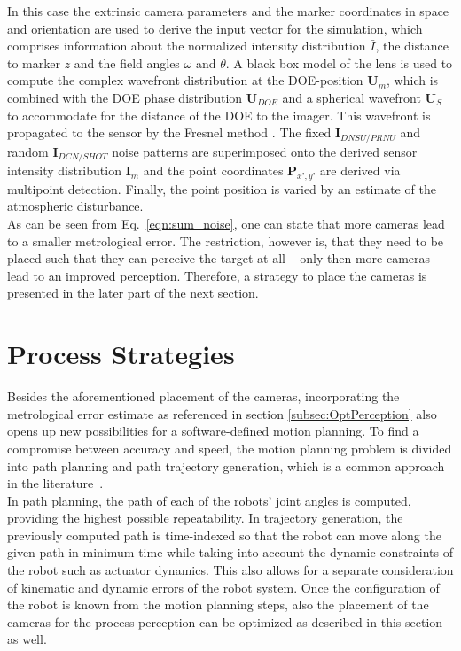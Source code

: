 \documentclass[5p,times,procedia]{elsarticle}
\begin{document}
%
In this case the extrinsic camera parameters and the marker coordinates in space and orientation are used to derive
the input vector for the simulation, which comprises information about the normalized intensity distribution $\bar{I}$, the distance to marker $z$ and the field angles $\omega$ and $\theta$. A black box model of the lens is used to compute the complex wavefront distribution at the DOE-position $\mathbf{U}_m$, which is combined with the DOE phase distribution $\mathbf{U}_{DOE}$ and a spherical wavefront $\mathbf{U}_{S}$ to accommodate for the distance of the DOE to the imager. This wavefront is propagated to the sensor by the Fresnel method \cite{Goodman2005}. The fixed $\mathbf{I}_{DNSU/PRNU}$ and random $\mathbf{I}_{DCN/SHOT}$ noise patterns are superimposed onto the derived sensor intensity distribution $\mathbf{I}_m$ and the point coordinates $\mathbf{P}_{x’,y’}$ are derived via multipoint detection.
Finally, the point position is varied by an estimate of the atmospheric disturbance.\\
%
As can be seen from Eq.~\ref{eqn:sum_noise}, one can state that more cameras lead to a smaller metrological error.
The restriction, however is, that they need to be placed such that they can perceive the target at all -- only then more cameras lead to an improved perception.
Therefore, a strategy to place the cameras is presented in the later part of the next section.
%
\section{Process Strategies}
Besides the aforementioned placement of the cameras, incorporating the metrological error estimate as referenced in section \ref{subsec:OptPerception} also opens up new possibilities for a software-defined motion planning.
To find a compromise between accuracy and speed, the motion planning problem is divided into path planning and path trajectory generation, which is a common approach in the literature~\cite{Choset05}.\\
In path planning, the path of each of the robots' joint angles is computed, providing the highest possible repeatability.
In trajectory generation, the previously computed path is time-indexed so that the robot can move along the given path in minimum time while taking into account the dynamic constraints of the robot such as actuator dynamics.
This also allows for a separate consideration of kinematic and dynamic errors of the robot system. 
Once the configuration of the robot is known from the motion planning steps, also the placement of the cameras for the process perception can be optimized as described in this section as well. 
\end{document}
